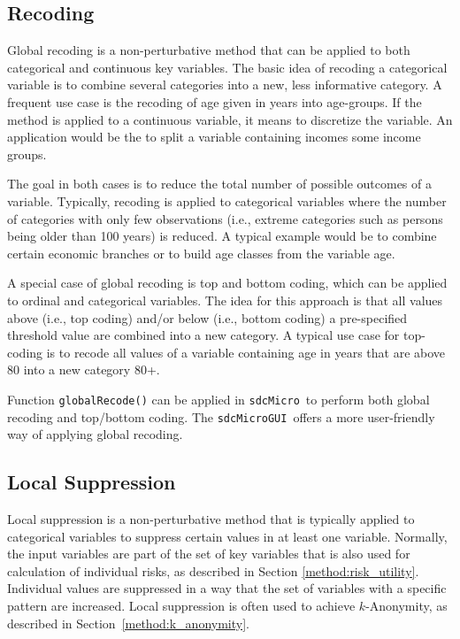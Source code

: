 \documentclass[12pt]{scrartcl}\usepackage[]{graphicx}\usepackage[]{color}
\newcommand{\sdcMicro}{\texttt{sdcMicro}}
\newcommand{\sdcMicroGUI}{\texttt{sdcMicroGUI}}
\begin{document}
\subsection{Recoding}\label{method:recoding}
Global recoding is a non-perturbative method that can be applied to both categorical and continuous key variables. The basic idea of recoding a categorical variable is to combine several categories into a new, less informative category. A frequent use case is the recoding of age given in years into age-groups. If the method is applied to a continuous variable, it means to discretize the variable. An application would be the to split a variable containing incomes some income groups.

The goal in both cases is to reduce the total number of possible outcomes of a variable. Typically, recoding is applied to categorical variables where the number of categories with only few observations (i.e., extreme categories such as persons being older than 100 years) is reduced. A typical example would be to combine certain economic branches or to build age classes from the variable age.

A special case of global recoding is top and bottom coding, which can be applied to ordinal and categorical variables. The idea for this approach is that all values above (i.e., top coding) and/or below (i.e., bottom coding) a pre-specified threshold value are combined into a new category. A typical use case for top-coding is to recode all values of a variable containing age in years that are above 80 into a new category 80+.

Function \lstinline{globalRecode()} can be applied in \sdcMicro \ to perform both global recoding and top/bottom coding. The \sdcMicroGUI \ offers a more user-friendly way of applying global recoding.

\subsection{Local Suppression}\label{method:localsupp}
Local suppression is a non-perturbative method that is typically applied to categorical variables to suppress certain values in at least one variable. Normally, the input variables are part of the set of key variables that is also used for calculation of individual risks, as described in Section \ref{method:risk_utility}. Individual values are suppressed in a way that the set of variables with a specific pattern are increased. Local suppression is often used to achieve $k$-Anonymity, as described in Section~\ref{method:k_anonymity}.
\end{document}
